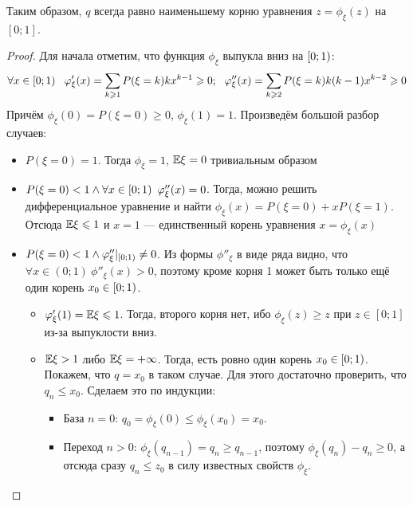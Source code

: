 \begin{note}
	Таким образом, $q$ всегда равно наименьшему корню уравнения $z = \phi_\xi(z)$ на $[0; 1]$.
\end{note}

\begin{proof}
	Для начала отметим, что функция $\phi_\xi$ выпукла вниз на $\left[0; 1\right)$:
	\[
		\forall x \in \left[0; 1\right)\ \ \varphi'_\xi(x) = \sum_{k \geqslant 1} P(\xi = k)kx^{k - 1} \geqslant 0;\ \ \varphi''_\xi(x) = \sum_{k \geqslant 2} P(\xi = k)k(k - 1)x^{k - 2} \geqslant 0
	\]
	Причём $\phi_\xi(0) = P(\xi = 0) \ge 0$, $\phi_\xi(1) = 1$. Произведём большой разбор случаев:
	\begin{itemize}
		\item $P(\xi = 0) = 1$. Тогда $\phi_\xi = 1$, $\mathbb{E}\xi = 0$ тривиальным образом
		
		\item $P(\xi = 0) < 1 \wedge \forall x \in \left[0; 1\right)\ \varphi''_\xi(x) = 0$. Тогда, можно решить дифференциальное уравнение и найти $\phi_\xi(x) = P(\xi = 0) + xP(\xi = 1)$. Отсюда $\mathbb{E} \xi \leqslant 1$ и $x = 1$ --- единственный корень уравнения $x = \phi_\xi(x)$
		
		\item $P(\xi = 0) < 1 \wedge \varphi''_\xi|_{\left[0; 1\right)} \neq 0$. Из формы $\phi''_\xi$ в виде ряда видно, что \\ $\forall x \in (0; 1)\ \phi''_\xi(x) > 0$, поэтому кроме корня 1 может быть только ещё один корень $x_0 \in \left[0; 1\right)$.
		\begin{itemize}
			\item $\varphi'_\xi(1) = \mathbb{E}\xi \leqslant 1$. Тогда, второго корня нет, ибо $\phi_\xi(z) \ge z$ при $z \in [0; 1]$ из-за выпуклости вниз.
			
			\item $\mathbb{E}\xi > 1$ либо $\mathbb{E}\xi = +\infty$. Тогда, есть ровно один корень $x_0 \in \left[0; 1\right)$. Покажем, что $q = x_0$ в таком случае. Для этого достаточно проверить, что $q_n \le x_0$. Сделаем это по индукции:
			\begin{itemize}
				\item База $n = 0$: $q_0 = \phi_\xi(0) \le \phi_\xi(x_0) = x_0$.
				
				\item Переход $n > 0$: $\phi_\xi(q_{n - 1}) = q_n \ge q_{n - 1}$, поэтому $\phi_\xi(q_n) - q_n \ge 0$, а отсюда сразу $q_n \le z_0$ в силу известных свойств $\phi_\xi$.
			\end{itemize}
		\end{itemize}
	\end{itemize}
\end{proof}

